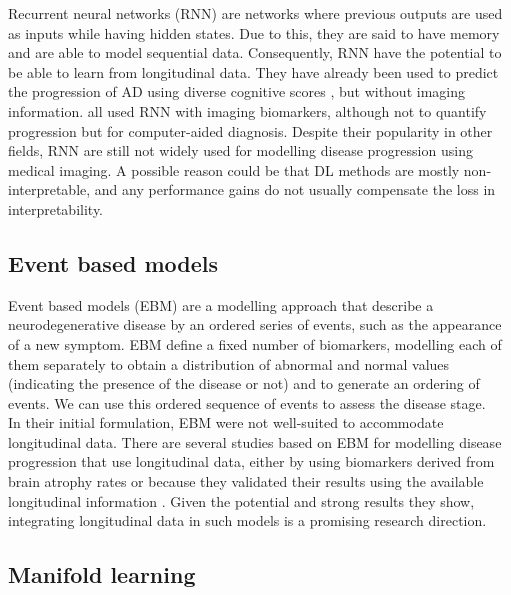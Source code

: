 Recurrent neural networks (RNN) are networks where previous outputs are used as inputs while having hidden states. Due to this, they are said to have memory and are able to model sequential data. Consequently, RNN have the potential to be able to learn from longitudinal data. They have already been used to predict the progression of AD using diverse cognitive scores \cite{Wang2018}, but without imaging information. \cite{Ghazi2019,Cui2018,Aghili2018} all used RNN with imaging biomarkers, although not to quantify progression but for computer-aided diagnosis. Despite their popularity in other fields, RNN are still not widely used for modelling disease progression using medical imaging. A possible reason could be that DL methods are mostly non-interpretable, and any performance gains do not usually compensate the loss in interpretability. \\ 

\subsection{Event based models}

Event based models (EBM) \cite{Fonteijn2012} are a modelling approach that describe a neurodegenerative disease by an ordered series of events, such as the appearance of a new symptom. EBM define a fixed number of biomarkers, modelling each of them separately to obtain a distribution of abnormal and normal values (indicating the presence of the disease or not) and to generate an ordering of events. We can use this ordered sequence of events to assess the disease stage. \\

In their initial formulation, EBM were not well-suited to accommodate longitudinal data. There are several studies based on EBM for modelling disease progression that use longitudinal data, either by using biomarkers derived from brain atrophy rates \cite{Fonteijn2012,Huang2012,Young2014} or because they validated their results using the available longitudinal information \cite{Oxtoby2018,Young2014}. Given the potential and strong results they show, integrating longitudinal data in such models is a promising research direction. \\

\subsection{Manifold learning}


